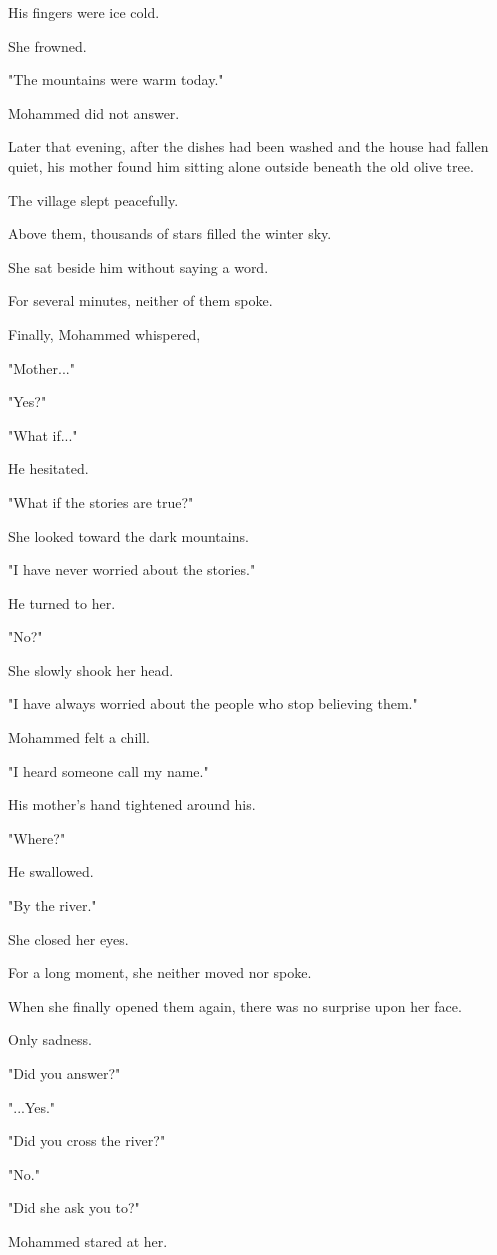 \documentclass[12pt,openany]{book}
\begin{document}
His fingers were ice cold.

She frowned.

"The mountains were warm today."

Mohammed did not answer.

Later that evening, after the dishes had been washed and the house had fallen quiet, his mother found him sitting alone outside beneath the old olive tree.

The village slept peacefully.

Above them, thousands of stars filled the winter sky.

She sat beside him without saying a word.

For several minutes, neither of them spoke.

Finally, Mohammed whispered,

"Mother..."

"Yes?"

"What if..."

He hesitated.

"What if the stories are true?"

She looked toward the dark mountains.

"I have never worried about the stories."

He turned to her.

"No?"

She slowly shook her head.

"I have always worried about the people who stop believing them."

Mohammed felt a chill.

"I heard someone call my name."

His mother's hand tightened around his.

"Where?"

He swallowed.

"By the river."

She closed her eyes.

For a long moment, she neither moved nor spoke.

When she finally opened them again, there was no surprise upon her face.

Only sadness.

"Did you answer?"

"...Yes."

"Did you cross the river?"

"No."

"Did she ask you to?"

Mohammed stared at her.
\end{document}
